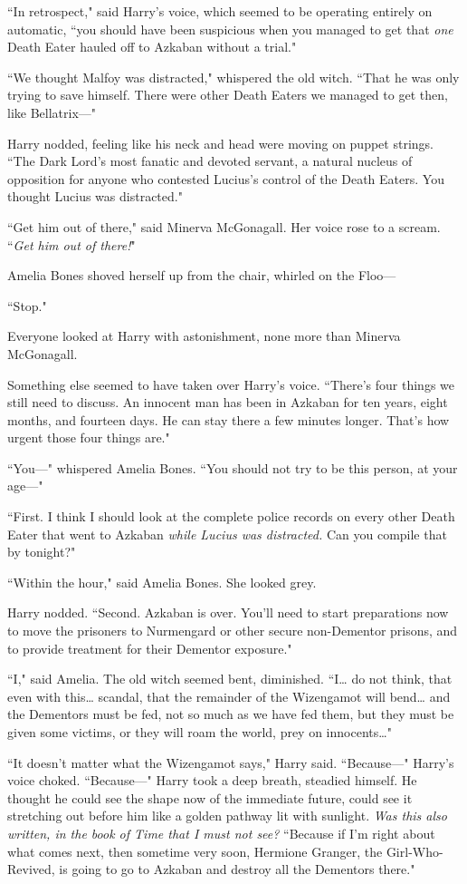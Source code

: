``In retrospect," said Harry's voice, which seemed to be operating entirely on automatic, ``you should have been suspicious when you managed to get that \emph{one} Death Eater hauled off to Azkaban without a trial."

``We thought Malfoy was distracted," whispered the old witch. ``That he was only trying to save himself. There were other Death Eaters we managed to get then, like Bellatrix---"

Harry nodded, feeling like his neck and head were moving on puppet strings. ``The Dark Lord's most fanatic and devoted servant, a natural nucleus of opposition for anyone who contested Lucius's control of the Death Eaters. You thought Lucius was distracted."

``Get him out of there," said Minerva McGonagall. Her voice rose to a scream. ``\emph{Get him out of there!}"

Amelia Bones shoved herself up from the chair, whirled on the Floo---

``Stop."

Everyone looked at Harry with astonishment, none more than Minerva McGonagall.

Something else seemed to have taken over Harry's voice. ``There's four things we still need to discuss. An innocent man has been in Azkaban for ten years, eight months, and fourteen days. He can stay there a few minutes longer. That's how urgent those four things are."

``You---" whispered Amelia Bones. ``You should not try to be this person, at your age---"

``First. I think I should look at the complete police records on every other Death Eater that went to Azkaban \emph{while Lucius was distracted.} Can you compile that by tonight?"

``Within the hour," said Amelia Bones. She looked grey.

Harry nodded. ``Second. Azkaban is over. You'll need to start preparations now to move the prisoners to Nurmengard or other secure non-Dementor prisons, and to provide treatment for their Dementor exposure."

``I," said Amelia. The old witch seemed bent, diminished. ``I{\ldots} do not think, that even with this{\ldots} scandal, that the remainder of the Wizengamot will bend{\ldots} and the Dementors must be fed, not so much as we have fed them, but they must be given some victims, or they will roam the world, prey on innocents{\ldots}"

``It doesn't matter what the Wizengamot says," Harry said. ``Because---" Harry's voice choked. ``Because---" Harry took a deep breath, steadied himself. He thought he could see the shape now of the immediate future, could see it stretching out before him like a golden pathway lit with sunlight. \emph{Was this also written, in the book of Time that I must not see?} ``Because if I'm right about what comes next, then sometime very soon, Hermione Granger, the Girl-Who-Revived, is going to go to Azkaban and destroy all the Dementors there."

